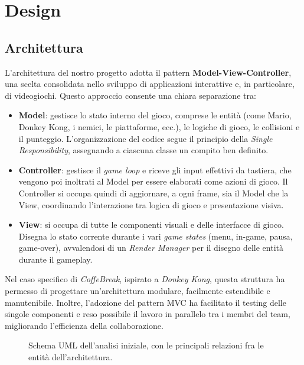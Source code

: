 \documentclass[a4paper,12pt]{report}
\begin{document}
\chapter{Design}
\section{Architettura}
L'architettura del nostro progetto adotta il pattern \textbf{Model-View-\newline Controller}, una scelta consolidata
nello sviluppo di applicazioni interattive e, in particolare, di videogiochi. Questo approccio consente una chiara separazione tra:

\begin{itemize}
	\item \textbf{Model}: gestisce lo stato interno del gioco, comprese le entità (come Mario, Donkey Kong, i nemici, le piattaforme, ecc.), le logiche di gioco, le collisioni e
	      il punteggio. L'organizzazione del codice segue il principio della \textit{Single Responsibility}, assegnando a ciascuna classe un compito ben definito.

	\item \textbf{Controller}: gestisce il \textit{game loop} \cite{game-as-a-lab} e riceve gli input effettivi da tastiera, che vengono poi inoltrati al Model per essere elaborati
	      come azioni di gioco. Il Controller si occupa quindi di aggiornare, a ogni frame, sia il Model che la View, coordinando l'interazione tra logica di gioco e presentazione visiva.

	\item \textbf{View}: si occupa di tutte le componenti visuali e delle interfacce di gioco. Disegna lo stato corrente durante i vari \textit{game states} (menu, in-game, pausa, game-over),
	      avvalendosi di un \textit{Render Manager} per il disegno delle entità durante il gameplay.
\end{itemize}

Nel caso specifico di \textit{CoffeBreak}, ispirato a \textit{Donkey Kong}, questa struttura ha permesso di progettare un'architettura modulare, facilmente
estendibile e manutenibile. Inoltre, l'adozione del pattern MVC ha facilitato il testing delle singole componenti e reso possibile il lavoro in parallelo tra i membri
del team, migliorando l'efficienza della collaborazione.
\begin{figure}[H]
	\centering{}
	
	\caption{Schema UML dell'analisi iniziale, con le principali relazioni fra le entità dell'architettura.}
	\label{img:View}
\end{figure}
\end{document}
